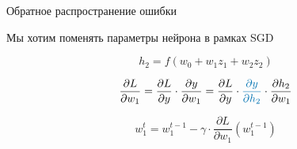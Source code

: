 \documentclass[notes,12pt, aspectratio=169]{beamer}
\begin{document}
\begin{frame}{Обратное распространение ошибки}

\alert{Мы хотим поменять параметры нейрона в рамках SGD}

\vfill

\[
h_2 = f(w_0 + w_1 z_1 + w_2 z_2)
\]

\vfill

\[
\frac{\partial L}{\partial w_1} = \frac{\partial L}{\partial y} \cdot \frac{\partial y}{\partial w_1} =  \frac{\partial L}{\partial y} \cdot {\color{blue} \frac{\partial y}{\partial h_2}} \cdot \frac{\partial h_2}{\partial w_1} 
\]

\vfill

\[
w_1^t = w_1^{t-1} - \gamma \cdot \frac{\partial L}{\partial w_1} (w_1^{t-1})
\]
\end{frame}
\end{document}
